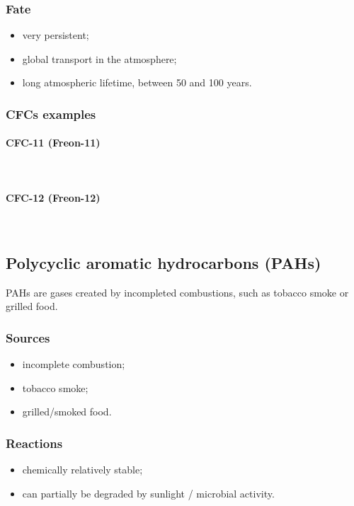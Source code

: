 \documentclass{article}
\newcommand{\pph}[1]{\paragraph{#1}\phantom{}\\}
\begin{document}
\subsubsection{Fate}
\begin{itemize}
    \item very persistent;
    \item global transport in the atmosphere;
    \item long atmospheric lifetime, between 50 and 100 years.
\end{itemize} 

\subsubsection{CFCs examples}
\pph{CFC-11 (Freon-11)}
\begin{center}
\end{center}

\pph{CFC-12 (Freon-12)}
\begin{center}
\end{center}

\newpage
\subsection{Polycyclic aromatic hydrocarbons (PAHs)}
PAHs are gases created by incompleted combustions, such as tobacco smoke
or grilled food.

\subsubsection{Sources}
\begin{itemize}
    \item incomplete combustion;
    \item tobacco smoke;
    \item grilled/smoked food.
\end{itemize}

\subsubsection{Reactions}
\begin{itemize}
    \item chemically relatively stable;
    \item can partially be degraded by sunlight / microbial activity.
\end{itemize}
\end{document}
